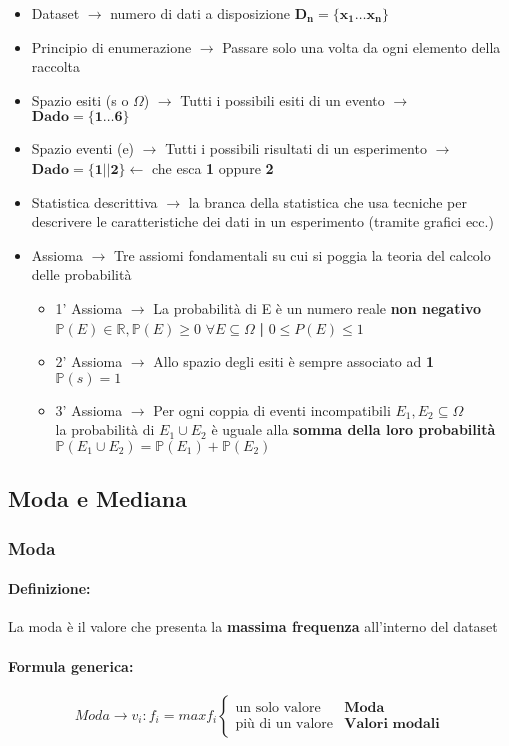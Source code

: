 \documentclass[]{article}
\newcommand{\definizione}{\paragraph{Definizione:}}
\newcommand{\formula}{\paragraph{Formula generica:}}
\begin{document}
\begin{itemize}
\begin{itemize}
        \end{itemize}
        \item Dataset $\rightarrow$ numero di dati a disposizione $\boldsymbol{D_n = \{ x_1 \ldots x_n \}} $
        \item Principio di enumerazione $\rightarrow$ Passare solo una volta da ogni elemento della raccolta
        \item Spazio esiti (s o $\Omega$) $\rightarrow$ Tutti i possibili esiti di un evento $\rightarrow$ $\boldsymbol{Dado=\{1 \ldots 6\}}$
        \item Spazio eventi (e) $\rightarrow$ Tutti i possibili risultati di un esperimento $\rightarrow$ $\boldsymbol{Dado=\{1||2\}} \leftarrow$ che esca \textbf{1} oppure \textbf{2}
        \item Statistica descrittiva $\rightarrow$ la branca della statistica che usa tecniche per descrivere le caratteristiche dei dati in un esperimento (tramite grafici ecc.)
        \item Assioma $\rightarrow$ Tre assiomi fondamentali su cui si poggia la teoria del calcolo delle probabilità
        \begin{itemize}
            \item 1' Assioma $\rightarrow$ La probabilità di E è un numero reale \textbf{non negativo} $\mathbb{P}(E) \in \mathbb{R}, \mathbb{P}(E) \geq 0$ $ \forall E \subseteq \Omega $ \space \textbf{|} \space $0 \leq P(E) \leq 1$
            \item 2' Assioma $\rightarrow$ Allo spazio degli esiti è sempre associato ad \textbf{1} \\ $\mathbb{P}(s) = 1$
            \item 3' Assioma $\rightarrow$ Per ogni coppia di eventi incompatibili $E_1, E_2 \subseteq \Omega$ \\ la probabilità di $E_1 \cup E_2$ è uguale alla \textbf{somma della loro probabilità} \\ $\mathbb{P}(E_1 \cup E_2) = \mathbb{P}(E_1) + \mathbb{P}(E_2)$
        \end{itemize} 
    \end{itemize}
    \newpage 

    \subsection{Moda e Mediana}
    \subsubsection{Moda}
    \definizione La moda è il valore che presenta la \textbf{massima frequenza} all'interno del dataset
    \formula
    \begin{equation*}
        Moda \rightarrow v_i : f_i = max f_i
        \begin{cases}
            \text{un solo valore} & \textbf{Moda} \\
            \text{più di un valore} & \textbf{Valori modali}
        \end{cases}
    \end{equation*}
\end{document}
